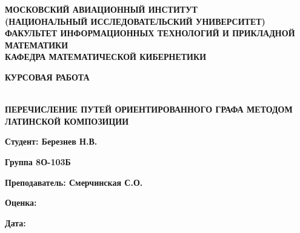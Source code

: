 \documentclass{article}
\author{Dyakov Kirill}
\begin{document}
\begin{center}
	\textbf{МОСКОВСКИЙ АВИАЦИОННЫЙ ИНСТИТУТ}
	\\
	\textbf{(НАЦИОНАЛЬНЫЙ ИССЛЕДОВАТЕЛЬСКИЙ УНИВЕРСИТЕТ)}
	\\ 
	\textbf{ФАКУЛЬТЕТ ИНФОРМАЦИОННЫХ ТЕХНОЛОГИЙ И ПРИКЛАДНОЙ МАТЕМАТИКИ}
	\\ 
	\textbf{КАФЕДРА МАТЕМАТИЧЕСКОЙ КИБЕРНЕТИКИ}
\end{center}
\vspace{100mm}
\begin{center}
	\begin{Large}\textbf{КУРСОВАЯ РАБОТА}\end{Large}
	\vspace{5mm}
	\\
	\textbf{ПЕРЕЧИСЛЕНИЕ ПУТЕЙ ОРИЕНТИРОВАННОГО ГРАФА МЕТОДОМ ЛАТИНСКОЙ КОМПОЗИЦИИ}
\end{center}
\vspace{70mm}
\begin{large}
	\par
	\hspace{105mm}\textbf{Студент: Березнев Н.В.}
	\vspace{3mm}
	\par
	\hspace{105mm}\textbf{Группа 8О-103Б}
	\vspace{3mm}
	\par
	\hspace{105mm}\textbf{Преподаватель: Смерчинская С.О.}
	\vspace{3mm}
	\par
	\hspace{105mm}\textbf{Оценка:}
	\vspace{3mm}
	\par
	\hspace{105mm}\textbf{Дата:}
\end{large}
\newpage
\end{document}
